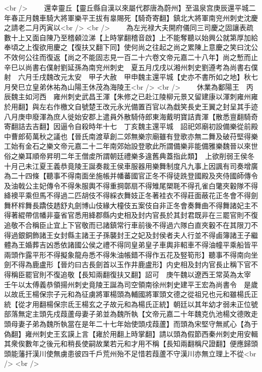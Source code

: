 <br />
　　還幸靈丘【靈丘縣自漢以來屬代郡唐為蔚州】至温泉宫庚辰還平城二年春正月魏車騎大將軍樂平王拔有辠賜死【騎奇寄翻】鎮北大將軍南兖州刺史沈慶之請老二月丙寅以<br />
<br />
　　為左光禄大夫開府儀同三司慶之固讓表疏數十上又面自陳乃至稽顙泣涕【上時掌翻稽音啟】上不能奪聽以始興公就第厚加給奉頃之上復欲用慶之【復扶又翻下同】使何尚之往起之尚之累陳上意慶之笑曰沈公不效何公往而復返【尚之不能固志見一百二十六卷文帝元嘉二十八年】尚之慙而止辛巳以尚書右僕射劉延孫為南兖州刺史　夏五月戊戌以湘州刺史劉遵考為尚書右僕射　六月壬戌魏改元太安　甲子大赦　甲申魏主還平城【史亦不書所如之地】秋七月癸巳立皇弟休祐為山陽王休茂為海陵王<br />
<br />
　　休業為鄱陽王　丙辰魏主如河西　雍州刺史武昌王渾【朱修之已赴江陵柳元景又留建康以渾刺雍州雍於用翻】與左右作檄文自號楚王改元永光備置百官以為戱笑長史王翼之封呈其手迹八月庚申廢渾為庶人徙始安郡上遣員外散騎侍郎東海戴明寶詰責渾【散悉亶翻騎奇寄翻詰去吉翻】因逼令自殺時年十七　丁亥魏主還平城　詔祀郊廟初設備樂從前殿中曹郎荀萬秋之議也【晉氏南渡草創二郊無樂宗廟雖有登歌亦無二舞及破苻堅得樂工始有金石之樂文帝元嘉二十二年南郊始設登歌此所謂備樂非能備雅樂魏晉以來世俗之樂耳順帝昇明二年王僧䖍所謂朝廷禮樂多違舊典蓋指此類】　上欲削弱王侯冬十月己未江夏王義恭竟陵王誕奏裁王侯車服器用樂舞制度凡九事上因諷有司奏增廣為二十四條【聽事不得南面坐施帳并幡蕃國官正冬不得徒跣登國殿及夾侍國師傳令及油戟公主妃傳令不得朱服輿不得重掆鄣扇不得雉尾槊毦不得孔雀白氅夾轂隊不得絳襖平乘但馬不得過二匹胡伎不得綵衣舞妓正冬著袿衣不得莊面蔽花正冬會不得劍舞杯柈舞長蹻伎䞬舒丸劍博山伎緣大橦伎五案伎自非正冬會奏舞曲不得舞諸妃主不得著緄帶信幡非臺省官悉用絳郡縣内史相及封内官長於其封君既非在三罷官則不復追敬不合稱臣止宜上下官敬而已諸鎮常行車前後不得過六隊白直夾轂不在其限刀不得過銀銅飾諸王女封縣主諸王子孫襲封王之妃及封侯者夫人行並不得鹵簿諸王子繼體為王婚葬吉凶悉依諸國公侯之禮不得同皇弟皇子車輿非軺車不得油幢平乘船皆平兩頭作露平形不得擬象龍舟悉不得朱油帳錯不得作五花及竪筍形】聽事不得南向坐劍不得為鹿盧形【晉灼曰古長劍首以玉作井鹿盧形】内史相及封内官長止稱下官不得稱臣罷官則不復追敬【長知兩翻復扶又翻】詔可　庚午魏以遼西王常英為太宰　壬午以太傅義恭領揚州刺史竟陵王誕為司空領南徐州刺史建平王宏為尚書令　是歲以故氐王楊保宗子元和為征虜將軍楊頭為輔國將軍頭文德之從祖兄也元和雖楊氏正統【從才用翻楊保宗氐王楊玄之子故元和為楊氏正統】朝廷以其年幼才弱未正位號部落無定主頭先戍葭蘆母妻子弟並為魏所執【文帝元嘉二十年魏克仇池楊文德敗走頭母妻子弟為魏所執當在是年二十七年始使頭戍葭蘆】而頭為宋堅守無貳心【為于偽翻】雍州刺史王玄謨上言【雍於用翻上時掌翻】請以頭為假節西秦州刺史用安輯其衆俟數年之後元和稍長使嗣故業若元和才用不稱【長知兩翻稱尺證翻】便應歸頭頭能藩扞漢川使無虜患彼四千戶荒州殆不足惜若葭蘆不守漢川亦無立理上不從<br />
<br />
